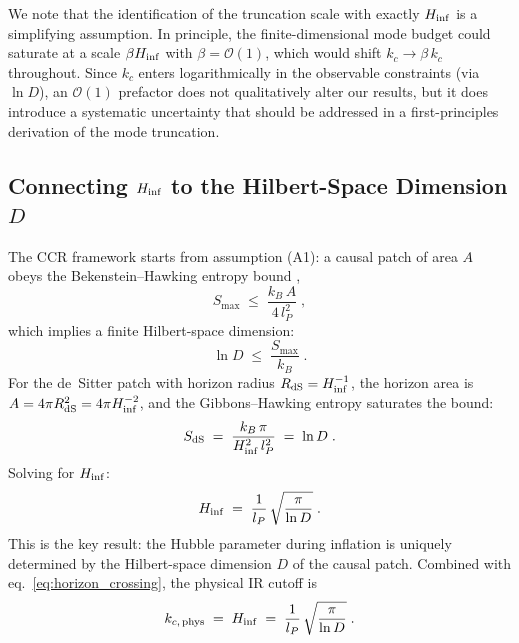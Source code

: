 We note that the identification of the truncation scale with exactly $H_{\rm inf}$ 
is a simplifying assumption. In principle, the finite-dimensional mode budget 
could saturate at a scale $\beta H_{\rm inf}$ with $\beta = \mathcal{O}(1)$, 
which would shift $k_c \to \beta\, k_c$ throughout. Since $k_c$ enters 
logarithmically in the observable constraints (via $\ln D$), an 
$\mathcal{O}(1)$ prefactor does not qualitatively alter our results, but it 
does introduce a systematic uncertainty that should be addressed in a 
first-principles derivation of the mode truncation.

\subsection{Connecting \texorpdfstring{$H_{\rm inf}$}{H\_inf} to the Hilbert-Space Dimension \texorpdfstring{$D$}{D}}
\label{subsec:H_to_D}

The CCR framework \cite{Chronis:2026} starts from assumption (A1): a causal
patch of area $A$ obeys the Bekenstein--Hawking entropy bound
\cite{Bekenstein:1973,Hawking:1975},
%
\begin{equation}
  S_{\max} \;\leq\; \frac{k_B\, A}{4\,l_P^2} \;,
  \label{eq:bekenstein}
\end{equation}
%
which implies a finite Hilbert-space dimension:
%
\begin{equation}
  \ln D \;\leq\; \frac{S_{\max}}{k_B} \;.
  \label{eq:lnD}
\end{equation}
%
For the de~Sitter patch with horizon radius $R_{\rm dS} = H_{\rm inf}^{-1}$,
the horizon area is $A = 4\pi R_{\rm dS}^2 = 4\pi H_{\rm inf}^{-2}$, and
the Gibbons--Hawking entropy \cite{Gibbons:1977} saturates the bound:
%
\begin{equation}
  S_{\rm dS} \;=\; \frac{k_B\,\pi}{H_{\rm inf}^2\,l_P^2} \;=\; \ln D \;.
  \label{eq:SdS}
\end{equation}
%
Solving for $H_{\rm inf}$:
%
\begin{equation}
  H_{\rm inf} \;=\; \frac{1}{l_P}\,\sqrt{\frac{\pi}{\ln D}} \;.
  \label{eq:H_inf}
\end{equation}
%
This is the key result: the Hubble parameter during inflation is uniquely
determined by the Hilbert-space dimension $D$ of the causal patch.
Combined with eq.~\eqref{eq:horizon_crossing}, the physical IR cutoff is
%
\begin{equation}
  k_{c,\,\rm phys} \;=\; H_{\rm inf} \;=\; \frac{1}{l_P}\,\sqrt{\frac{\pi}{\ln D}} \;.
  \label{eq:kc_phys}
\end{equation}
%
